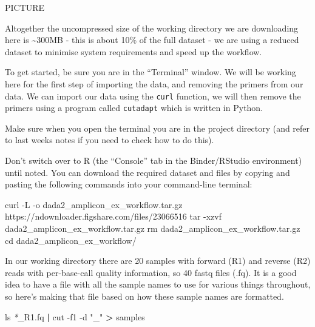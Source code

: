\documentclass[
]{book}
\newenvironment{Shaded}{\begin{snugshade}}{\end{snugshade}}
\newcommand{\AttributeTok}[1]{\textcolor[rgb]{0.77,0.63,0.00}{#1}}
\newcommand{\BuiltInTok}[1]{#1}
\newcommand{\ExtensionTok}[1]{#1}
\newcommand{\FunctionTok}[1]{\textcolor[rgb]{0.00,0.00,0.00}{#1}}
\newcommand{\KeywordTok}[1]{\textcolor[rgb]{0.13,0.29,0.53}{\textbf{#1}}}
\newcommand{\NormalTok}[1]{#1}
\newcommand{\OperatorTok}[1]{\textcolor[rgb]{0.81,0.36,0.00}{\textbf{#1}}}
\newcommand{\PreprocessorTok}[1]{\textcolor[rgb]{0.56,0.35,0.01}{\textit{#1}}}
\newcommand{\StringTok}[1]{\textcolor[rgb]{0.31,0.60,0.02}{#1}}
\begin{document}
PICTURE

Altogether the uncompressed size of the working directory we are downloading here is \textasciitilde300MB - this is about 10\% of the full dataset - we are using a reduced dataset to minimise system requirements and speed up the workflow.

To get started, be sure you are in the ``Terminal'' window. We will be working here for the first step of importing the data, and removing the primers from our data. We can import our data using the \texttt{curl} function, we will then remove the primers using a program called \texttt{cutadapt} which is written in Python.

Make sure when you open the terminal you are in the project directory (and refer to last weeks notes if you need to check how to do this).

Don't switch over to R (the ``Console'' tab in the Binder/RStudio environment) until noted. You can download the required dataset and files by copying and pasting the following commands into your command-line terminal:

\begin{Shaded}
\begin{Highlighting}[]
    \ExtensionTok{curl} \AttributeTok{{-}L} \AttributeTok{{-}o}\NormalTok{ dada2\_amplicon\_ex\_workflow.tar.gz https://ndownloader.figshare.com/files/23066516}
    \FunctionTok{tar} \AttributeTok{{-}xzvf}\NormalTok{ dada2\_amplicon\_ex\_workflow.tar.gz}
    \FunctionTok{rm}\NormalTok{ dada2\_amplicon\_ex\_workflow.tar.gz}
    \BuiltInTok{cd}\NormalTok{ dada2\_amplicon\_ex\_workflow/}
\end{Highlighting}
\end{Shaded}

In our working directory there are 20 samples with forward (R1) and reverse (R2) reads with per-base-call quality information, so 40 fastq files (.fq). It is a good idea to have a file with all the sample names to use for various things throughout, so here's making that file based on how these sample names are formatted.

\begin{Shaded}
\begin{Highlighting}[]
    \FunctionTok{ls} \PreprocessorTok{*}\NormalTok{\_R1.fq }\KeywordTok{|} \FunctionTok{cut} \AttributeTok{{-}f1} \AttributeTok{{-}d} \StringTok{"\_"} \OperatorTok{\textgreater{}}\NormalTok{ samples}
\end{Highlighting}
\end{Shaded}
\end{document}

